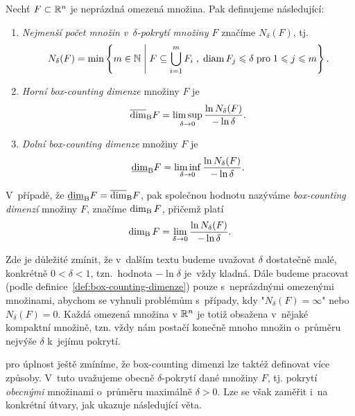 \begin{definition}\label{def:box-counting-dimenze}
    Nechť $F\subset \mathbb{R}^n$ je neprázdná omezená množina. Pak definujeme následující:
    \begin{enumerate}[label=(\alph*)]
        \item \emph{Nejmenší počet množin v~$\delta$-pokrytí množiny $F$} značíme $N_\delta(F)$, tj.
        \[N_\delta(F)=\min\left\{m\in\mathbb{N}\;\middle|\;F\subseteq\bigcup_{i=1}^m F_i\;,\;\operatorname{diam}{F_j}\leqslant\delta\;\text{pro}\;1\leqslant j\leqslant m\right\}.\]
        \item \emph{Horní box-counting dimenze} množiny $F$ je
        \[\overline{\dim}_\textup{B}{F}=\limsup_{\delta\to 0}\dfrac{\ln{N_\delta(F)}}{-\ln{\delta}}.\]
        \item \emph{Dolní box-counting dimenze} množiny $F$ je
        \[\underline{\dim}_\textup{B}{F}=\liminf_{\delta\to 0}\dfrac{\ln{N_\delta(F)}}{-\ln{\delta}}.\]
    \end{enumerate}
    V~případě, že $\underline{\dim}_\textup{B}{F}=\overline{\dim}_\textup{B}{F}$, pak společnou hodnotu nazýváme \emph{box-counting dimenzí} množiny $F$, značíme $\operatorname{dim_B}{F}$, přičemž platí
    \[\operatorname{dim_B}{F}=\lim_{\delta\to 0}\dfrac{\ln{N_\delta(F)}}{-\ln{\delta}}.\]
\end{definition}
\begin{remark}
    Zde je důležité zmínit, že v~dalším textu budeme uvažovat $\delta$ dostatečně malé, konkrétně $0<\delta<1$, tzn.~hodnota $-\ln{\delta}$ je~vždy kladná. Dále budeme pracovat (podle definice~\ref{def:box-counting-dimenze}) pouze s~neprázdnými omezenými množinami, abychom se vyhnuli problémům s~případy, kdy "$N_\delta(F)=\infty$" nebo $N_\delta(F)=0$. Každá omezená množina v $\mathbb{R}^n$ je totiž obsažena v~nějaké kompaktní množině, tzn. vždy nám postačí konečně mnoho množin o~průměru nejvýše $\delta$ k~jejímu pokrytí.
\end{remark}
pro úplnost ještě zmíníme, že box-counting dimenzi lze taktéž definovat více způsoby. V~tuto uvažujeme obecně $\delta$-pokrytí dané množiny $F$, tj. pokrytí \emph{obecnými} množinami o~průměru maximálně $\delta>0$. Lze se však zaměřit i~na konkrétní útvary, jak ukazuje následující věta.
